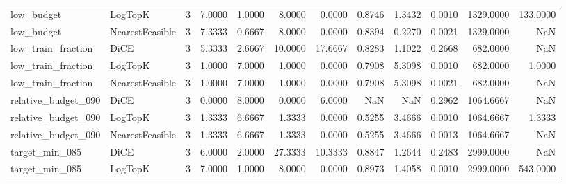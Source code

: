 \begin{tabular}{llrrrrrrrrrr}
          low\_budget &         LogTopK &      3 &            7.0000 &          1.0000 &          8.0000 &        0.0000 &             0.8746 &         1.3432 &       0.0010 &          1329.0000 &              133.0000 \\
          low\_budget & NearestFeasible &      3 &            7.3333 &          0.6667 &          8.0000 &        0.0000 &             0.8394 &         0.2270 &       0.0021 &          1329.0000 &                   NaN \\
  low\_train\_fraction &            DiCE &      3 &            5.3333 &          2.6667 &         10.0000 &       17.6667 &             0.8283 &         1.1022 &       0.2668 &           682.0000 &                   NaN \\
  low\_train\_fraction &         LogTopK &      3 &            1.0000 &          7.0000 &          1.0000 &        0.0000 &             0.7908 &         5.3098 &       0.0010 &           682.0000 &                1.0000 \\
  low\_train\_fraction & NearestFeasible &      3 &            1.0000 &          7.0000 &          1.0000 &        0.0000 &             0.7908 &         5.3098 &       0.0021 &           682.0000 &                   NaN \\
 relative\_budget\_090 &            DiCE &      3 &            0.0000 &          8.0000 &          0.0000 &        6.0000 &                NaN &            NaN &       0.2962 &          1064.6667 &                   NaN \\
 relative\_budget\_090 &         LogTopK &      3 &            1.3333 &          6.6667 &          1.3333 &        0.0000 &             0.5255 &         3.4666 &       0.0010 &          1064.6667 &                1.3333 \\
 relative\_budget\_090 & NearestFeasible &      3 &            1.3333 &          6.6667 &          1.3333 &        0.0000 &             0.5255 &         3.4666 &       0.0013 &          1064.6667 &                   NaN \\
      target\_min\_085 &            DiCE &      3 &            6.0000 &          2.0000 &         27.3333 &       10.3333 &             0.8847 &         1.2644 &       0.2483 &          2999.0000 &                   NaN \\
      target\_min\_085 &         LogTopK &      3 &            7.0000 &          1.0000 &          8.0000 &        0.0000 &             0.8973 &         1.4058 &       0.0010 &          2999.0000 &              543.0000 \\

\end{tabular}
